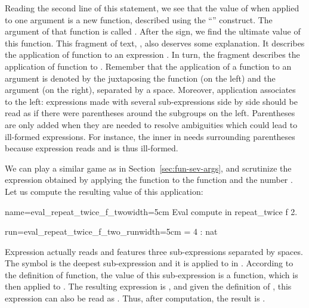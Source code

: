 Reading the second line of this statement, we see that the value
of  when applied to one argument is a new
function, described using the ``'' construct.  The
argument of that function is called .  After the \C{=>} sign, we
find the ultimate value of this function.  This fragment of text, , also deserves some explanation. It describes the
application of function  to an expression .  In turn,
the fragment  describes the application of function  to
. Remember that the  application of a function to an
argument is denoted by the juxtaposing the function (on the left) and
the argument (on the right), separated by a space. Moreover,
application associates to the left: expressions made with
several sub-expressions side by side should be read as if there were
parentheses around the subgroups on the left. Parentheses are
only added when they are needed to resolve ambiguities which could
lead to ill-formed expressions.  For instance, the inner  in
 needs surrounding parentheses because expression
 reads  and is thus ill-formed.

We can play a similar game as in Section~\ref{sec:fun-sev-args},
and scrutinize the expression obtained by applying the
function  to  the function
 and the number . Let us compute the resulting value of this
application:

\begin{coq}{name=eval_repeat_twice_f_two}{width=5cm}
Eval compute in repeat_twice f 2.
\end{coq}
\begin{coqout}{run=eval_repeat_twice_f_two_run}{width=5cm}
= 4 : nat
\end{coqout}

Expression  actually reads
 and features three sub-expressions separated by
spaces. The symbol  is the deepest
sub-expression and it is applied to  in .
According to the definition of  function, the value of
this sub-expression is a function, which is then applied to .
The resulting expression is , and given the
definition of , this expression can also
be read as .  Thus, after computation, the result is .

